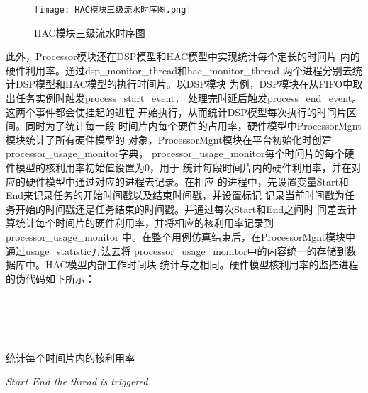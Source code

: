 \begin{figure}
    \centering
    \texttt{[image: HAC模块三级流水时序图.png]}
    \caption{HAC模块三级流水时序图}
    \label{fig:badge}
\end{figure}

此外，Processor模块还在DSP模型和HAC模型中实现统计每个定长的时间片
内的硬件利用率。通过dsp\_monitor\_thread和hac\_monitor\_thread
两个进程分别去统计DSP模型和HAC模型的执行时间片。以DSP模块
为例，DSP模块在从FIFO中取出任务实例时触发process\_start\_event，
处理完时延后触发process\_end\_event。这两个事件都会使挂起的进程
开始执行，从而统计DSP模型每次执行的时间片区间。同时为了统计每一段
时间片内每个硬件的占用率，硬件模型中ProcessorMgnt模块统计了所有硬件模型的
对象，ProcessorMgnt模块在平台初始化时创建processor\_usage\_monitor字典，
processor\_usage\_monitor每个时间片的每个硬件模型的核利用率初始值设置为0，用于
统计每段时间片内的硬件利用率，并在对应的硬件模型中通过对应的进程去记录。在相应
的进程中，先设置变量Start和End来记录任务的开始时间戳以及结束时间戳，并设置标记
记录当前时间戳为任务开始的时间戳还是任务结束的时间戳。并通过每次Start和End之间时
间差去计算统计每个时间片的硬件利用率，并将相应的核利用率记录到processor\_usage\_monitor
中。在整个用例仿真结束后，在ProcessorMgnt模块中通过usage\_statistic方法去将
processor\_usage\_monitor中的内容统一的存储到数据库中。HAC模型内部工作时间块
统计与之相同。硬件模型核利用率的监控进程的伪代码如下所示：
\\
\\
\\
\\
\\
\begin{algorithm}[h]
    \renewcommand{\algorithmcfname}{伪代码}
    \caption{统计每个时间片内的核利用率}
    \BlankLine
    $Start$ \;
    $End$ \;
    \emph{the thread is triggered}\;
\end{algorithm}

